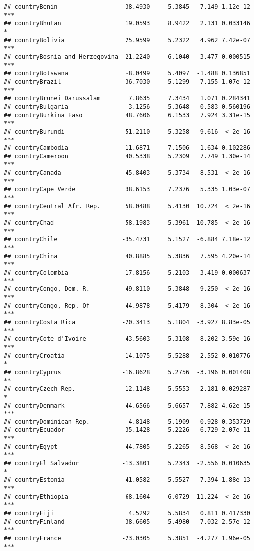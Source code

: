\documentclass[
  11pt,
]{article}
\begin{document}
\begin{verbatim}
## countryBenin                   38.4930     5.3845   7.149 1.12e-12 ***
## countryBhutan                  19.0593     8.9422   2.131 0.033146 *  
## countryBolivia                 25.9599     5.2322   4.962 7.42e-07 ***
## countryBosnia and Herzegovina  21.2240     6.1040   3.477 0.000515 ***
## countryBotswana                -8.0499     5.4097  -1.488 0.136851    
## countryBrazil                  36.7030     5.1299   7.155 1.07e-12 ***
## countryBrunei Darussalam        7.8635     7.3434   1.071 0.284341    
## countryBulgaria                -3.1256     5.3648  -0.583 0.560196    
## countryBurkina Faso            48.7606     6.1533   7.924 3.31e-15 ***
## countryBurundi                 51.2110     5.3258   9.616  < 2e-16 ***
## countryCambodia                11.6871     7.1506   1.634 0.102286    
## countryCameroon                40.5338     5.2309   7.749 1.30e-14 ***
## countryCanada                 -45.8403     5.3734  -8.531  < 2e-16 ***
## countryCape Verde              38.6153     7.2376   5.335 1.03e-07 ***
## countryCentral Afr. Rep.       58.0488     5.4130  10.724  < 2e-16 ***
## countryChad                    58.1983     5.3961  10.785  < 2e-16 ***
## countryChile                  -35.4731     5.1527  -6.884 7.18e-12 ***
## countryChina                   40.8885     5.3836   7.595 4.20e-14 ***
## countryColombia                17.8156     5.2103   3.419 0.000637 ***
## countryCongo, Dem. R.          49.8110     5.3848   9.250  < 2e-16 ***
## countryCongo, Rep. Of          44.9878     5.4179   8.304  < 2e-16 ***
## countryCosta Rica             -20.3413     5.1804  -3.927 8.83e-05 ***
## countryCote d'Ivoire           43.5603     5.3108   8.202 3.59e-16 ***
## countryCroatia                 14.1075     5.5288   2.552 0.010776 *  
## countryCyprus                 -16.8628     5.2756  -3.196 0.001408 ** 
## countryCzech Rep.             -12.1148     5.5553  -2.181 0.029287 *  
## countryDenmark                -44.6566     5.6657  -7.882 4.62e-15 ***
## countryDominican Rep.           4.8148     5.1909   0.928 0.353729    
## countryEcuador                 35.1428     5.2226   6.729 2.07e-11 ***
## countryEgypt                   44.7805     5.2265   8.568  < 2e-16 ***
## countryEl Salvador            -13.3801     5.2343  -2.556 0.010635 *  
## countryEstonia                -41.0582     5.5527  -7.394 1.88e-13 ***
## countryEthiopia                68.1604     6.0729  11.224  < 2e-16 ***
## countryFiji                     4.5292     5.5834   0.811 0.417330    
## countryFinland                -38.6605     5.4980  -7.032 2.57e-12 ***
## countryFrance                 -23.0305     5.3851  -4.277 1.96e-05 ***

\end{verbatim}
\end{document}
